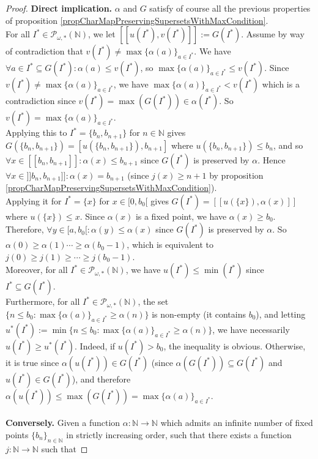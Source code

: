 \documentclass[a4paper,11pt]{article}
\theoremstyle{plain}
\theoremstyle{definition}
\theoremstyle{remark}
\begin{document}
\begin{proof}
\textbf{Direct implication.} $\alpha$ and $G$ satisfy of course all the previous properties of proposition \ref{propCharMapPreservingSupersetsWithMaxCondition}. \\
For all $I^* \in \mathcal{P}_{\omega,*}(\mathbb{N})$, we let $[\![u(I^*),v(I^*)]\!] := G(I^*)$. Assume by way of contradiction that $v(I^*) \neq \max\{\alpha(a)\}_{a \in I^*}$. We have $\forall a \in I^* \subseteq G(I^*) : \alpha(a) \leq v(I^*)$, so $\max\{\alpha(a)\}_{a \in I^*} \leq v(I^*)$. Since $v(I^*) \neq \max\{\alpha(a)\}_{a \in I^*}$, we have $\max\{\alpha(a)\}_{a \in I^*} < v(I^*)$ which is a contradiction since $v(I^*) = \max(G(I^*)) \in \alpha(I^*)$. So $v(I^*) = \max\{\alpha(a)\}_{a \in I^*}$. \\
Applying this to $I^* = \{b_n,b_{n+1}\}$ for $n \in \mathbb{N}$ gives $G(\{b_n,b_{n+1}\}) = [u(\{b_n,b_{n+1}\}),b_{n+1}]$ where $u(\{b_n,b_{n+1}\}) \leq b_n$, and so $\forall x \in [\![b_n,b_{n+1}]\!] : \alpha(x) \leq b_{n+1}$ since $G(I^*)$ is preserved by $\alpha$. Hence $\forall x \in ]\!]b_n,b_{n+1}]\!] : \alpha(x) = b_{n+1}$ (since $j(x) \geq n+1$ by proposition \ref{propCharMapPreservingSupersetsWithMaxCondition}). \\
Applying it for $I^* = \{x\}$ for $x \in [0,b_0[$ gives $G(I^*) = [\![u(\{x\}),\alpha(x)]\!]$ where $u(\{x\}) \leq x$. Since $\alpha(x)$ is a fixed point, we have $\alpha(x) \geq b_0$. Therefore, $\forall y \in [a,b_0[ : \alpha(y) \leq \alpha(x)$ since $G(I^*)$ is preserved by $\alpha$. So $\alpha(0) \geq \alpha(1) \cdots \geq \alpha(b_0-1)$, which is equivalent to $j(0) \geq j(1) \geq \cdots \geq j(b_0 - 1)$.  \\
Moreover, for all $I^* \in \mathcal{P}_{\omega,*}(\mathbb{N})$, we have $u(I^*) \leq \min(I^*)$ since $I^* \subseteq G(I^*)$. \\
Furthermore, for all $I^* \in \mathcal{P}_{\omega,*}(\mathbb{N})$, the set $\{n \leq b_0 : \max\{\alpha(a)\}_{a \in I^*} \geq \alpha(n) \}$ is non-empty (it contains $b_0$), and letting $u^*(I^*) := \min \{n \leq b_0 : \max\{\alpha(a)\}_{a \in I^*} \geq \alpha(n) \}$, we have necessarily $u(I^*) \geq u^*(I^*)$. Indeed, if $u(I^*) > b_0$, the inequality is obvious. Otherwise, it is true since $\alpha(u(I^*)) \in G(I^*)$ (since $\alpha(G(I^*)) \subseteq G(I^*)$ and $u(I^*) \in G(I^*)$), and therefore $\alpha(u(I^*)) \leq \max(G(I^*)) =  \max\{\alpha(a)\}_{a \in I^*}$. \\ \\
\textbf{Conversely.} Given a function $\alpha : \mathbb{N} \to \mathbb{N}$ which admits an infinite number of fixed points $\{b_n\}_{n \in \mathbb{N}}$ in strictly increasing order, such that there exists a function $j : \mathbb{N} \to \mathbb{N}$ such that 

\end{proof}
\end{document}
